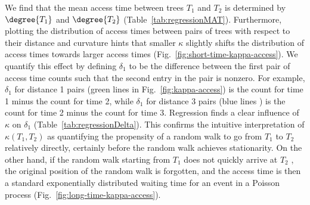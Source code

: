 \documentclass[11pt,onecolumn,conference]{IEEEtran}
\newcommand{\cuttable}[2][]{%
    \ifthenelse{\equal{#1}{}}%
		{}%
		{#1}%
}
\begin{document}
We find that the mean access time between trees $T_1$ and $T_2$ is determined by $\degree{T_1}$ and $\degree{T_2}$ (Table~\ref{tab:regressionMAT}).
Furthermore, plotting the distribution of access times between pairs of trees with respect to their distance and curvature hints that smaller $\kappa$ slightly shifts the distribution of access times towards larger access times (Fig.~\ref{fig:short-time-kappa-access}).
We quantify this effect by defining $\delta_1$ to be the difference between the first pair of access time counts such that the second entry in the pair is nonzero.
For example, $\delta_1$ for distance 1 pairs (green lines in Fig.~\ref{fig:kappa-access}) is the count for time 1 minus the count for time 2, while $\delta_1$ for distance 3 pairs (blue lines\cuttable{ in Fig.~\ref{fig:kappa-access}}) is the count for time 2 minus the count for time 3.
Regression finds a clear influence of $\kappa$ on $\delta_1$ (Table~\ref{tab:regressionDelta}).
This confirms the intuitive interpretation of $\kappa(T_1, T_2)$ as quantifying the propensity of a random walk to go from $T_1$ to $T_2$ relatively directly, certainly before the random walk achieves stationarity.
On the other hand, if the random walk starting from $T_1$ does not quickly arrive at $T_2$\cuttable{ and instead achieves stationarity}, the original position of the random walk is forgotten, and the access time is then a standard exponentially distributed waiting time for an event in a Poisson process (Fig.~\ref{fig:long-time-kappa-access}).
\end{document}
